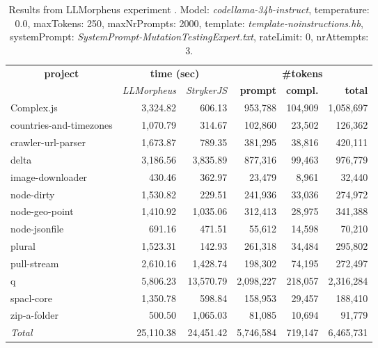 
\begin{table*}[hbt!]
\centering
{\scriptsize
\begin{tabular}{l||r|r|r|r|r}
\multicolumn{1}{c|}{\bf project} & \multicolumn{2}{|c|}{\bf time (sec)} & \multicolumn{3}{|c|}{\bf \#tokens} \\
               & {\it LLMorpheus} & {\it StrykerJS} & {\bf prompt} & {\bf compl.} & {\bf total} \\
\hline
  Complex.js & 3,324.82 & 606.13 & 953,788 & 104,909 & 1,058,697 \\ 
countries-and-timezones & 1,070.79 & 314.67 & 102,860 & 23,502 & 126,362 \\ 
crawler-url-parser & 1,673.87 & 789.35 & 381,295 & 38,816 & 420,111 \\ 
delta & 3,186.56 & 3,835.89 & 877,316 & 99,463 & 976,779 \\ 
image-downloader & 430.46 & 362.97 & 23,479 & 8,961 & 32,440 \\ 
node-dirty & 1,530.82 & 229.51 & 241,936 & 33,036 & 274,972 \\ 
node-geo-point & 1,410.92 & 1,035.06 & 312,413 & 28,975 & 341,388 \\ 
node-jsonfile & 691.16 & 471.51 & 55,612 & 14,598 & 70,210 \\ 
plural & 1,523.31 & 142.93 & 261,318 & 34,484 & 295,802 \\ 
pull-stream & 2,610.16 & 1,428.74 & 198,302 & 74,195 & 272,497 \\ 
q & 5,806.23 & 13,570.79 & 2,098,227 & 218,057 & 2,316,284 \\ 
spacl-core & 1,350.78 & 598.84 & 158,953 & 29,457 & 188,410 \\ 
zip-a-folder & 500.50 & 1,065.03 & 81,085 & 10,694 & 91,779 \\ 
\hline
  \textit{Total} & 25,110.38 & 24,451.42 & 5,746,584 & 719,147 & 6,465,731 \\
  \end{tabular}
  }
  \\[2mm]
  \caption{Results from LLMorpheus experiment .
    Model: \textit{codellama-34b-instruct}, 
    temperature: 0.0, 
    maxTokens: 250, 
    maxNrPrompts: 2000, 
    template: \textit{template-noinstructions.hb}, 
    systemPrompt: \textit{SystemPrompt-MutationTestingExpert.txt}, 
    rateLimit: 0, 
    nrAttempts: 3.  
  }
  \label{table:Cost:run379:codellama-34b-instruct:template-noinstructions.hb:0.0}
\end{table*}